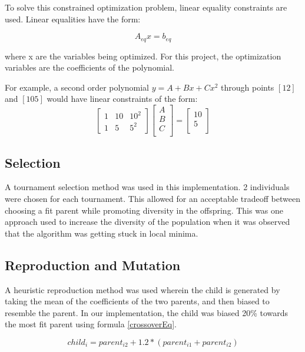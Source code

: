 To solve this constrained optimization problem, linear equality constraints are used. Linear equalities
have the form:

\begin{equation}
A_{eq}x = b_{eq}
\end{equation}

where x are the variables being optimized. For this project, the optimization variables are the
coefficients of the polynomial.

For example, a second order polynomial $y = A + Bx + Cx^2$ through points $[1 2]$ and $[10 5]$ would have linear constraints of the form:
\begin{equation} 
\begin{bmatrix}
1 & 10 & 10^2 \\
1 & 5 & 5^2
\end{bmatrix}
\begin{bmatrix}
A \\
B \\
C \\
\end{bmatrix} = 
\begin{bmatrix}
10 \\
5 \\
\end{bmatrix}
\end{equation}
\subsection{Selection}
A tournament selection method was used in this implementation. 2 individuals were chosen for each tournament. This allowed for an acceptable tradeoff between choosing a fit parent while promoting diversity in the offspring. This was one approach used to increase the diversity of the population when it was observed that the algorithm was getting stuck in local minima.

\subsection{Reproduction and Mutation}
A heuristic reproduction method was used wherein the child is generated by taking the mean of the coefficients of the two parents, and then biased to resemble the parent. In our implementation, the child was biased 20\% towards the most fit parent using formula \ref{crossoverEq}.

\begin{equation} \label{crossoverEq}
child_i = parent_{i2} + 1.2 * (parent_{i1} + parent_{i2})
\end{equation}

